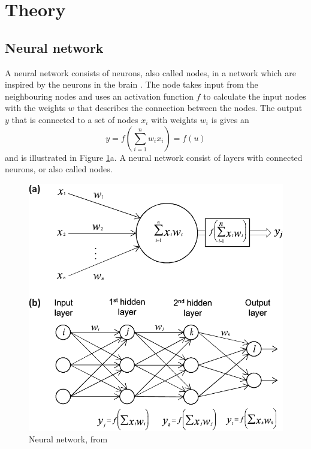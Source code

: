 \documentclass[../../main/main.tex]{subfiles}
\begin{document}
\section{Theory}
\label{sec:theory}



\subsection{Neural network}
\label{sec:neural-network}


A neural network consists of neurons, also called nodes, in a network which are inspired by the neurons in the brain \cite{morten}. The node takes input from the neighbouring  nodes and uses an activation function \(f\) to calculate the input nodes with the weights \(w\) that describes the connection between the nodes. The output \(y\) that is connected to a set of nodes \(x_i\) with weights \(w_i\) is gives an
\begin{equation}
  \label{eq:art-neurons}
  y = f\left( \sum_{i=1}^n w_ix_i\right) = f(u)
\end{equation}
and is illustrated in Figure \ref{fig:neuron}a. A neural network consist of layers with connected neurons, or also called nodes.
\begin{figure}[H]
  \centering
  \includegraphics[width=\linewidth]{../../figures/neuron.png}
  \caption{Neural network, from \cite{morten}}
  \label{fig:neuron}  
\end{figure}
\end{document}
